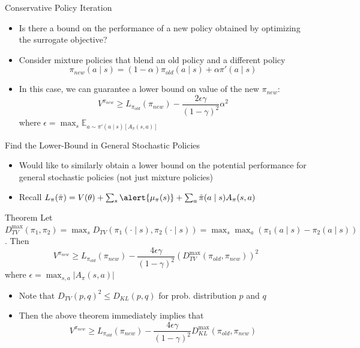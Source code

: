 \documentclass[aspectratio=169]{../latex_main/tntbeamer}  %
\begin{document}
\begin{frame}[c]{Conservative Policy Iteration}
	
    \begin{itemize}
        \item Is there a bound on the performance of a new policy obtained by optimizing the surrogate objective?
        \item Consider mixture policies that blend an old policy and a different policy
        $$\pi_{new}(a \mid s) = (1 - \alpha) \pi_{old} (a \mid s) + \alpha \pi'(a \mid s) $$
        \item In this case, we can guarantee a lower bound on value of the new $\pi_{new}$:
        $$V^{\pi_{new}} \geq L_{\pi_{old}} (\pi_{new}) - \frac{2\epsilon\gamma}{(1- \gamma)^2} \alpha^2 $$
        where $\epsilon = \max_{s} \mathbb{E}_{a \sim \pi'(a \mid s) [A_\pi(s,a)]}$
    \end{itemize}

\end{frame}
\begin{frame}[c]{Find the Lower-Bound in General Stochastic Policies}
	
	 \vspace{-1.5em}
    \begin{itemize}
        \item Would like to similarly obtain a lower bound on the potential performance for general stochastic policies (not just mixture policies)
        \item Recall $ L_\pi(\Tilde{\pi}) = V(\theta) + \sum_{s} \alert{\mu_\pi (s)} + \sum_{a} \Tilde{\pi}(a \mid s) A_\pi(s,a)$ 
    \end{itemize}
    
    \begin{block}{Theorem}
    Let $D_{TV}^{\max} (\pi_1, \pi_2) = \max_{s} D_{TV}(\pi_1(\cdot \mid s), \pi_2(\cdot\mid s)) = \max_{s} \max_{a} (\pi_1(a\mid s) -\pi_2 (a\mid s))$. Then
    $$V^{\pi_{new}} \geq L_{\pi_{old}} (\pi_{new}) - \frac{4\epsilon\gamma}{(1-\gamma)^2} (D_{TV}^{\max}(\pi_{old}, \pi_{new}))^2$$
    where $\epsilon = \max_{s,a}|A_\pi(s,a)|$
    \end{block}
    
    \begin{itemize}
        \item Note that $D_{TV}(p,q)^2 \leq D_{KL}(p,q)$ for prob. distribution $p$ and $q$
        \item Then the above theorem immediately implies that
        $$ V^{\pi_{new}} \geq  L_{\pi_{old}} (\pi_{new}) -  \frac{4\epsilon\gamma}{(1-\gamma)^2} D_{KL}^{\max}(\pi_{old}, \pi_{new}) $$
    \end{itemize}

\end{frame}
\end{document}
